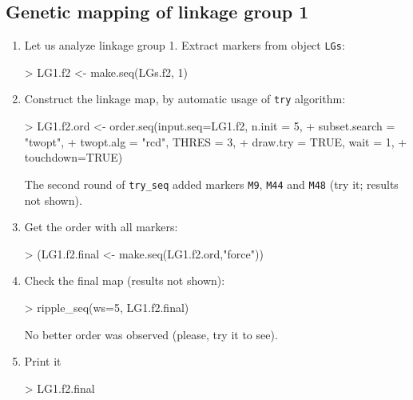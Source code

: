 \documentclass[letterpaper,12pt,oneside]{article}
\begin{document}
\subsection{Genetic mapping of linkage group 1}

\begin{enumerate}
\item Let us analyze linkage group 1. Extract markers from object {\tt LGs}:
\begin{Schunk}
\begin{Sinput}
> LG1.f2 <- make.seq(LGs.f2, 1)
\end{Sinput}
\end{Schunk}

\item Construct the linkage map, by automatic usage of {\tt try} algorithm:
\begin{Schunk}
\begin{Sinput}
> LG1.f2.ord <- order.seq(input.seq=LG1.f2, n.init = 5, 
+                         subset.search = "twopt", 
+                         twopt.alg = "rcd", THRES = 3, 
+                         draw.try = TRUE, wait = 1,
+                         touchdown=TRUE)
\end{Sinput}
\end{Schunk}
The second round of {\tt try_seq} added markers {\tt M9}, {\tt M44} and {\tt M48} (try it; results not shown).

\item Get the order with all markers:
\begin{Schunk}
\begin{Sinput}
> (LG1.f2.final <- make.seq(LG1.f2.ord,"force"))
\end{Sinput}
\end{Schunk}

\item Check the final map (results not shown):
\begin{Schunk}
\begin{Sinput}
> ripple_seq(ws=5, LG1.f2.final)
\end{Sinput}
\end{Schunk}

No better order was observed (please, try it to see).

\item Print it
\begin{Schunk}
\begin{Sinput}
> LG1.f2.final
\end{Sinput}
\end{Schunk}

\end{enumerate}
\end{document}
